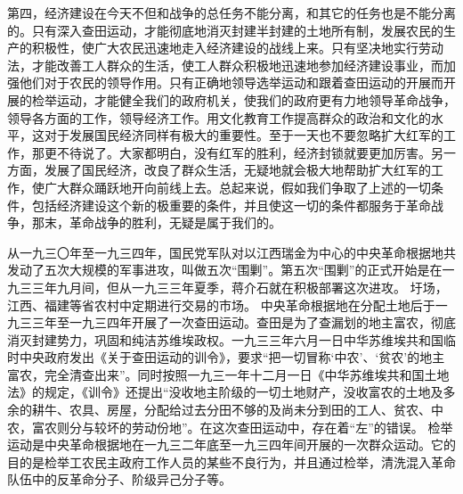 第四，经济建设在今天不但和战争的总任务不能分离，和其它的任务也是不能分离的。只有深入查田运动，才能彻底地消灭封建半封建的土地所有制，发展农民的生产的积极性，使广大农民迅速地走入经济建设的战线上来。只有坚决地实行劳动法，才能改善工人群众的生活，使工人群众积极地迅速地参加经济建设事业，而加强他们对于农民的领导作用。只有正确地领导选举运动和跟着查田运动的开展而开展的检举运动，才能健全我们的政府机关，使我们的政府更有力地领导革命战争，领导各方面的工作，领导经济工作。用文化教育工作提高群众的政治和文化的水平，这对于发展国民经济同样有极大的重要性。至于一天也不要忽略扩大红军的工作，那更不待说了。大家都明白，没有红军的胜利，经济封锁就要更加厉害。另一方面，发展了国民经济，改良了群众生活，无疑地就会极大地帮助扩大红军的工作，使广大群众踊跃地开向前线上去。总起来说，假如我们争取了上述的一切条件，包括经济建设这个新的极重要的条件，并且使这一切的条件都服务于革命战争，那末，革命战争的胜利，无疑是属于我们的。


\begin{maonote}
从一九三〇年至一九三四年，国民党军队对以江西瑞金为中心的中央革命根据地共发动了五次大规模的军事进攻，叫做五次“围剿”。第五次“围剿”的正式开始是在一九三三年九月间，但从一九三三年夏季，蒋介石就在积极部署这次进攻。
圩场，江西、福建等省农村中定期进行交易的市场。
中央革命根据地在分配土地后于一九三三年至一九三四年开展了一次查田运动。查田是为了查漏划的地主富农，彻底消灭封建势力，巩固和纯洁苏维埃政权。一九三三年六月一日中华苏维埃共和国临时中央政府发出《关于查田运动的训令》，要求“把一切冒称‘中农’、‘贫农’的地主富农，完全清查出来”。同时按照一九三一年十二月一日《中华苏维埃共和国土地法》的规定，《训令》还提出“没收地主阶级的一切土地财产，没收富农的土地及多余的耕牛、农具、房屋，分配给过去分田不够的及尚未分到田的工人、贫农、中农，富农则分与较坏的劳动份地”。在这次查田运动中，存在着“左”的错误。
检举运动是中央革命根据地在一九三二年底至一九三四年间开展的一次群众运动。它的目的是检举工农民主政府工作人员的某些不良行为，并且通过检举，清洗混入革命队伍中的反革命分子、阶级异己分子等。
\end{maonote}
